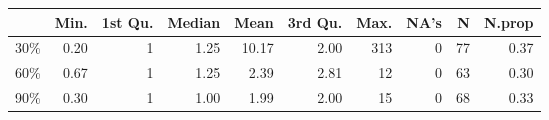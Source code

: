 \begin{table}[ht]
\centering
\begin{tabular}{lrrrrrrrrr}
  \hline
 & Min. & 1st Qu. & Median & Mean & 3rd Qu. & Max. & NA's & N & N.prop \\ 
  \hline
30\% & 0.20 &   1 & 1.25 & 10.17 & 2.00 & 313 &   0 &  77 & 0.37 \\ 
  60\% & 0.67 &   1 & 1.25 & 2.39 & 2.81 &  12 &   0 &  63 & 0.30 \\ 
  90\% & 0.30 &   1 & 1.00 & 1.99 & 2.00 &  15 &   0 &  68 & 0.33 \\ 
   \hline
\end{tabular}
\end{table}
